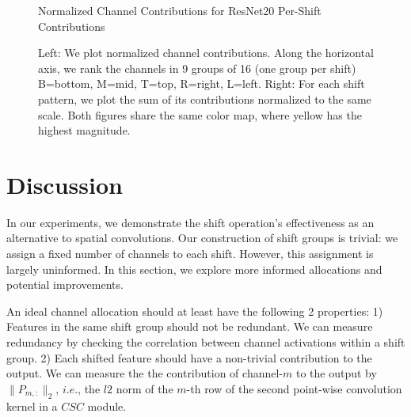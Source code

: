 \documentclass[10pt,twocolumn,letterpaper]{article}
\begin{document}
\begin{figure*}
\vspace{-.1in}
\caption*{\hspace{.8in} Normalized Channel Contributions for ResNet20 \hspace*{1.6in} Per-Shift Contributions}
\caption{Left: We plot normalized channel contributions. Along the horizontal axis, we rank the channels in 9 groups of 16 (one group per shift) B=bottom, M=mid, T=top, R=right, L=left. Right: For each shift pattern, we plot the sum of its contributions normalized to the same scale. Both figures share the same color map, where yellow has the highest magnitude.}
\label{fig:NCC}
\vspace{-.2in}
\end{figure*}

\section{Discussion}
In our experiments, we demonstrate the shift operation's effectiveness as an alternative to spatial convolutions. Our construction of shift groups is trivial: we assign a fixed number of channels to each shift. However, this assignment is largely uninformed. In this section, we explore more informed allocations and potential improvements.

An ideal channel allocation should at least have the following 2 properties: 1) Features in the same shift group should not be redundant. We can measure redundancy by checking the correlation between channel activations within a shift group. 2) Each shifted feature should have a non-trivial contribution to the output. We can measure the the contribution of channel-$m$ to the output by $\|P_{m, :}\|_2$, $i.e.$, the $l2$ norm of the $m$-th row of the second point-wise convolution kernel in a $CSC$ module. 
\end{document}
